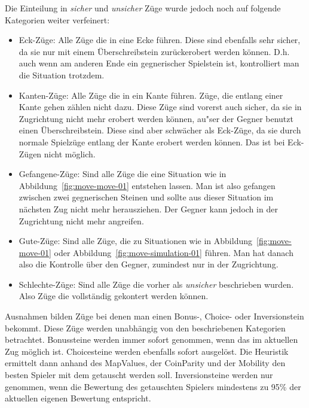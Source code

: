 Die Einteilung in \textit{sicher} und \textit{unsicher} Z\"uge wurde jedoch noch auf folgende Kategorien weiter verfeinert:
\begin{itemize}
    \item Eck-Z\"uge: Alle Z\"uge die in eine Ecke f\"uhren.
        Diese sind ebenfalls sehr sicher, da sie nur mit einem \"Uberschreibstein zur\"uckerobert werden k\"onnen.
        D.h. auch wenn am anderen Ende ein gegnerischer Spielstein ist, kontrolliert man die Situation trotzdem.
    \item Kanten-Z\"uge: Alle Z\"uge die in ein Kante f\"uhren.
        Z\"uge, die entlang einer Kante gehen z\"ahlen nicht dazu.
        Diese Z\"uge sind vorerst auch sicher, da sie in Zugrichtung nicht mehr erobert werden k\"onnen, au"ser der Gegner benutzt einen \"Uberschreibstein.
        Diese sind aber schw\"acher als Eck-Z\"uge, da sie durch normale Spielz\"uge entlang der Kante erobert werden k\"onnen.
        Das ist bei Eck-Z\"ugen nicht m\"oglich.
    \item Gefangene-Z\"uge: Sind alle Z\"uge die eine Situation wie in Abbildung~\ref{fig:move-move-01} entstehen lassen.
        Man ist also gefangen zwischen zwei gegnerischen Steinen und sollte aus dieser Situation im n\"achsten Zug nicht mehr herausziehen.
        Der Gegner kann jedoch in der Zugrichtung nicht mehr angreifen.
    \item Gute-Z\"uge: Sind alle Z\"uge, die zu Situationen wie in Abbildung~\ref{fig:move-move-01} oder Abbildung~\ref{fig:move-simulation-01} f\"uhren.
        Man hat danach also die Kontrolle \"uber den Gegner, zumindest nur in der Zug\-rich\-tung.
    \item Schlechte-Z\"uge: Sind alle Z\"uge die vorher als \textit{unsicher} beschrieben wurden.
        Also Z\"uge die vollst\"andig gekontert werden k\"onnen.
\end{itemize}
\vspace{1em}

Ausnahmen bilden Z\"uge bei denen man einen Bonus-, Choice- oder Inversionstein bekommt.
Diese Z\"uge werden unabh\"angig von den beschriebenen Kategorien betrachtet.
Bonussteine werden immer sofort genommen, wenn das im aktuellen Zug m\"oglich ist.
Choicesteine werden ebenfalls sofort ausgel\"ost.
Die Heuristik ermittelt dann anhand des MapValues, der CoinParity und der Mobility den besten Spieler mit dem getauscht werden soll.
Inversionsteine werden nur genommen, wenn die Bewertung des getauschten Spielers mindestens zu 95\% der aktuellen eigenen Bewertung entspricht.

